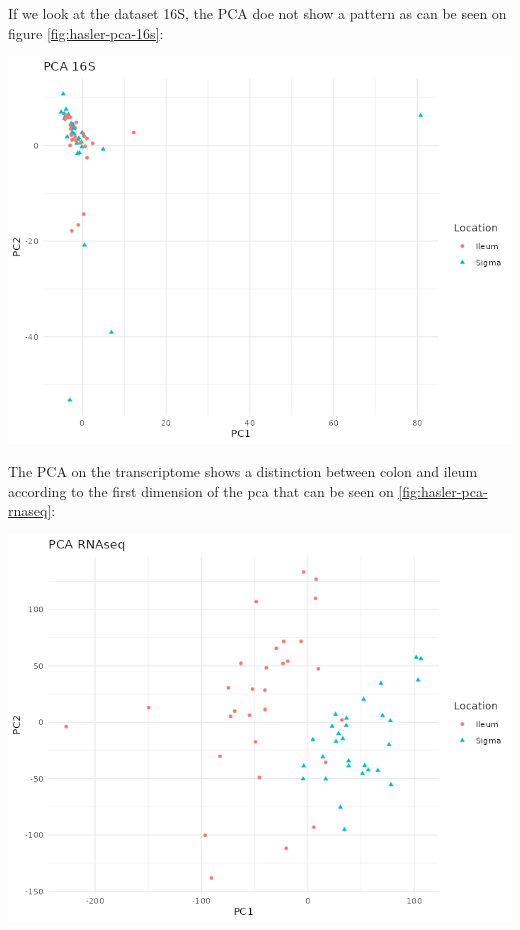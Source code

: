 \documentclass[
  12pt,
  a4paper,
  twoside,
  openright]{book}
\let\origfigure\figure
\let\endorigfigure\endfigure
\renewenvironment{figure}[1][2] {
    \expandafter\origfigure\expandafter[!htp]
} {
    \endorigfigure
}
\begin{document}
If we look at the dataset 16S, the PCA doe not show a pattern as can be seen on figure \ref{fig:hasler-pca-16s}:

\begin{figure}
\includegraphics[width=1\linewidth]{images/hasler_PCA_16S} \caption[PCA of 16S of the Häsler's dataset.]{PCA of 16S of Häsler's dataset colored by the location of the samples.}\label{fig:hasler-pca-16s}
\end{figure}

The PCA on the transcriptome shows a distinction between colon and ileum according to the first dimension of the pca that can be seen on \ref{fig:hasler-pca-rnaseq}:

\begin{figure}
\includegraphics[width=1\linewidth]{images/hasler_PCA_RNAseq} \caption[PCA of RNAseq of the Häsler's dataset.]{PCA of RNAseq of the Häsler's dataset. The samples are colored by location sigma and ileum. There are two clear groups according to the location.}\label{fig:hasler-pca-rnaseq}
\end{figure}
\end{document}
